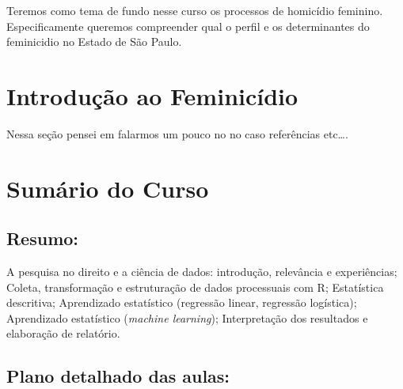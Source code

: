 \documentclass[
  letterpaper,
  DIV=11,
  numbers=noendperiod]{scrreprt}
\begin{document}
Teremos como tema de fundo nesse curso os processos de homicídio
feminino. Especificamente queremos compreender qual o perfil e os
determinantes do feminicidio no Estado de São Paulo.


\hypertarget{introduuxe7uxe3o-ao-feminicuxeddio}{%
\chapter{Introdução ao
Feminicídio}\label{introduuxe7uxe3o-ao-feminicuxeddio}}

Nessa seção pensei em falarmos um pouco no no caso referências
etc\ldots.


\hypertarget{sumuxe1rio-do-curso}{%
\chapter{Sumário do Curso}\label{sumuxe1rio-do-curso}}

\hypertarget{resumo}{%
\section{\texorpdfstring{\textbf{Resumo}:}{Resumo:}}\label{resumo}}

A pesquisa no direito e a ciência de dados: introdução, relevância e
experiências; Coleta, transformação e estruturação de dados processuais
com R; Estatística descritiva; Aprendizado estatístico (regressão
linear, regressão logística); Aprendizado estatístico (\emph{machine
learning}); Interpretação dos resultados e elaboração de relatório.

\hypertarget{plano-detalhado-das-aulas}{%
\section{\texorpdfstring{\textbf{Plano detalhado das
aulas:}}{Plano detalhado das aulas:}}\label{plano-detalhado-das-aulas}}
\end{document}
